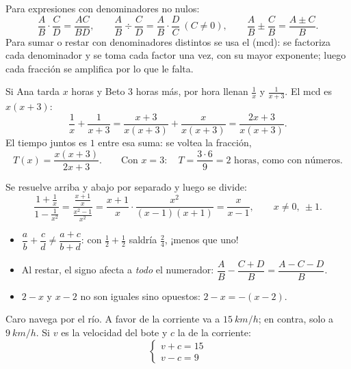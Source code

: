 \documentclass[11pt,a4paper]{article}
\begin{document}
\begin{propiedad}
Para expresiones con denominadores no nulos:
\[
\frac{A}{B}\cdot\frac{C}{D}=\frac{AC}{BD},\qquad
\frac{A}{B}\div\frac{C}{D}=\frac{A}{B}\cdot\frac{D}{C}\ (C\neq0),\qquad
\frac{A}{B}\pm\frac{C}{B}=\frac{A\pm C}{B}.
\]
Para sumar o restar con denominadores distintos se usa el  (mcd): se factoriza cada
denominador y se toma cada factor una vez, con su mayor exponente; luego cada fracción se amplifica por lo que le falta.
\end{propiedad}

\begin{ejemplo}
Si Ana tarda $x$ horas y Beto $3$ horas más, por hora llenan $\frac1x$ y $\frac1{x+3}$. El mcd es $x(x+3)$:
\[ \frac1x+\frac1{x+3}=\frac{x+3}{x(x+3)}+\frac{x}{x(x+3)}=\frac{2x+3}{x(x+3)} . \]
El tiempo juntos es $1$ entre esa suma: se voltea la fracción,
\[ T(x)=\frac{x(x+3)}{2x+3}. \qquad\text{Con }x=3:\quad T=\frac{3\cdot6}{9}=2\text{ horas, como con números.} \]
\end{ejemplo}

\begin{ejemplo}
Se resuelve arriba y abajo por separado y luego se divide:
\[ \frac{1+\frac1x}{1-\frac1{x^2}}=\frac{\frac{x+1}{x}}{\frac{x^2-1}{x^2}}=\frac{x+1}{x}\cdot\frac{x^2}{(x-1)(x+1)}=\frac{x}{x-1},
\qquad x\neq0,\ \pm1 . \]
\end{ejemplo}

\begin{ojo}
\begin{itemize}
\item $\dfrac{a}{b}+\dfrac{c}{d}\neq\dfrac{a+c}{b+d}$: con $\frac12+\frac12$ saldría $\frac24$, ¡menos que uno!
\item Al restar, el signo afecta a \emph{todo} el numerador: $\dfrac{A}{B}-\dfrac{C+D}{B}=\dfrac{A-C-D}{B}$.
\item $2-x$ y $x-2$ no son iguales sino opuestos: $2-x=-(x-2)$.
\end{itemize}
\end{ojo}


Caro navega por el río. A favor de la corriente va a $\SI{15}{km/h}$; en contra, solo a $\SI{9}{km/h}$. Si $v$ es la
velocidad del bote y $c$ la de la corriente:
\[ \begin{cases} v+c=15\\ v-c=9 \end{cases} \]
\end{document}
